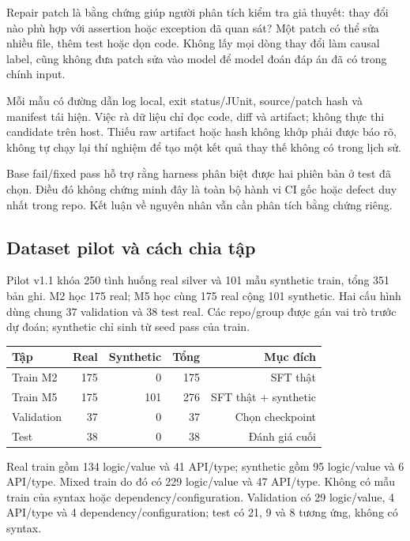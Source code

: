 \documentclass[12pt,a4paper]{article}
\begin{document}
Repair patch là bằng chứng giúp người phân tích kiểm tra giả thuyết: thay đổi nào phù hợp với assertion hoặc exception đã quan sát? Một patch có thể sửa nhiều file, thêm test hoặc dọn code. Không lấy mọi dòng thay đổi làm causal label, cũng không đưa patch sửa vào model để model đoán đáp án đã có trong chính input.

Mỗi mẫu có đường dẫn log local, exit status/JUnit, source/patch hash và manifest tái hiện. Việc rà dữ liệu chỉ đọc code, diff và artifact; không thực thi candidate trên host. Thiếu raw artifact hoặc hash không khớp phải được báo rõ, không tự chạy lại thí nghiệm để tạo một kết quả thay thế không có trong lịch sử.

Base fail/fixed pass hỗ trợ rằng harness phân biệt được hai phiên bản ở test đã chọn. Điều đó không chứng minh đây là toàn bộ hành vi CI gốc hoặc defect duy nhất trong repo. Kết luận về nguyên nhân vẫn cần phân tích bằng chứng riêng.

\nextpage
\subsection{Dataset pilot và cách chia tập}
Pilot v1.1 khóa 250 tình huống real silver và 101 mẫu synthetic train, tổng 351 bản ghi. M2 học 175 real; M5 học cùng 175 real cộng 101 synthetic. Hai cấu hình dùng chung 37 validation và 38 test real. Các repo/group được gán vai trò trước dự đoán; synthetic chỉ sinh từ seed pass của train.

\begin{center}
\begin{tabular}{lrrrr}\toprule
Tập & Real & Synthetic & Tổng & Mục đích\\\midrule
Train M2 &175&0&175&SFT thật\\
Train M5 &175&101&276&SFT thật + synthetic\\
Validation &37&0&37&Chọn checkpoint\\
Test &38&0&38&Đánh giá cuối\\\bottomrule
\end{tabular}\end{center}

\begin{center}\small
\end{center}

Real train gồm 134 logic/value và 41 API/type; synthetic gồm 95 logic/value và 6 API/type. Mixed train do đó có 229 logic/value và 47 API/type. Không có mẫu train của syntax hoặc dependency/configuration. Validation có 29 logic/value, 4 API/type và 4 dependency/configuration; test có 21, 9 và 8 tương ứng, không có syntax.
\end{document}
